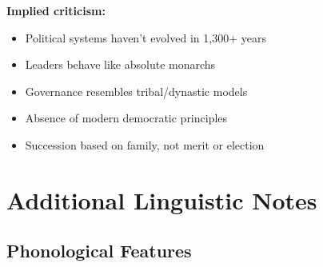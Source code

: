 \documentclass[letterpaper,12pt]{article}
\begin{document}
\begin{tcolorbox}[colback=boxcolor,colframe=accentcolor,title=\textbf{Detailed Historical Background},breakable]
\textbf{Implied criticism:}
\begin{itemize}
\item Political systems haven't evolved in 1,300+ years
\item Leaders behave like absolute monarchs
\item Governance resembles tribal/dynastic models
\item Absence of modern democratic principles
\item Succession based on family, not merit or election
\end{itemize}
\end{tcolorbox}

\section{Additional Linguistic Notes}

\subsection{Phonological Features}
\end{document}
